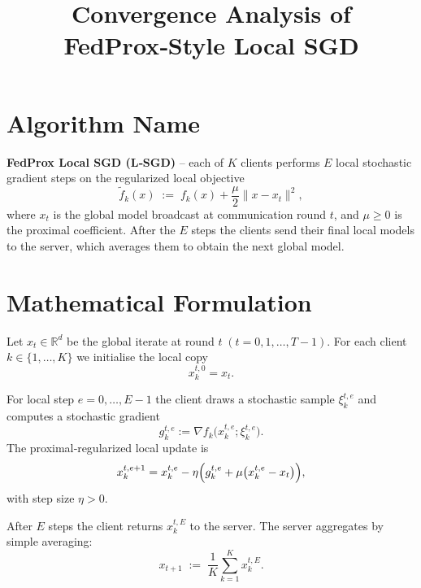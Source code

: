 \documentclass{article}
\newcommand{\R}{\mathbb{R}}
\begin{document}
\title{Convergence Analysis of FedProx‑Style Local SGD}
\author{}
\date{}
\maketitle

\section*{Algorithm Name}
\textbf{FedProx Local SGD (L‑SGD)} – each of $K$ clients performs $E$ local stochastic gradient steps on the regularized local objective 
\[
\tilde f_k(x) \;:=\; f_k(x) + \frac{\mu}{2}\|x-x_t\|^2,
\]
where $x_t$ is the global model broadcast at communication round $t$, and $\mu\ge 0$ is the proximal coefficient. After the $E$ steps the clients send their final local models to the server, which averages them to obtain the next global model.

\section*{Mathematical Formulation}
Let $x_t\in\R^d$ be the global iterate at round $t\;(t=0,1,\dots,T-1)$.  
For each client $k\in\{1,\dots,K\}$ we initialise the local copy
\[
x_{k}^{t,0}=x_t .
\]

For local step $e=0,\dots,E-1$ the client draws a stochastic sample $\xi_{k}^{t,e}$ and computes a stochastic gradient 
\[
g_{k}^{t,e}:=\nabla f_k\bigl(x_{k}^{t,e};\xi_{k}^{t,e}\bigr).
\]
The proximal‑regularized local update is
\begin{equation}
\label{eq:local_update}
x_{k}^{t,e+1}=x_{k}^{t,e}-\eta\Bigl(g_{k}^{t,e}+\mu\bigl(x_{k}^{t,e}-x_t\bigr)\Bigr),
\end{equation}
with step size $\eta>0$.

After $E$ steps the client returns $x_{k}^{t,E}$ to the server. The server aggregates by simple averaging:
\begin{equation}
\label{eq:global_update}
x_{t+1}\;:=\;\frac{1}{K}\sum_{k=1}^{K}x_{k}^{t,E}.
\end{equation}
\end{document}
